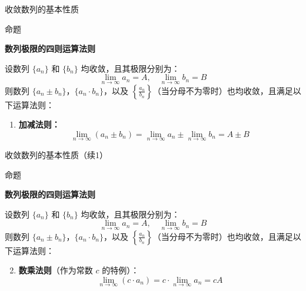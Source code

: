 \documentclass[aspectratio=169,10pt,fontset=fandol]{ctexbeamer}
\begin{document}
\begin{frame}[t,fragile]{收敛数列的基本性质}
\small
\begin{block}{命题}
{\small
\textbf{数列极限的四则运算法则}\par



设数列 $\{a_n\}$ 和 $\{b_n\}$ 均收敛，且其极限分别为：
\begin{equation*}
	\lim\limits_{n \to \infty} a_n = A, \quad \lim\limits_{n \to \infty} b_n = B
\end{equation*}
则数列 $\{a_n \pm b_n\}$，$\{a_n \cdot b_n\}$，以及 $\left\{\frac{a_n}{b_n}\right\}$（当分母不为零时）也均收敛，且满足以下运算法则：

\begin{enumerate}
	\item \textbf{加减法则：}
	\begin{equation*}
		\lim\limits_{n \to \infty} (a_n \pm b_n) = \lim\limits_{n \to \infty} a_n \pm \lim\limits_{n \to \infty} b_n = A \pm B
	\end{equation*}
	
	
\end{enumerate}
}
\end{block}
\end{frame}
\begin{frame}[t,fragile]{收敛数列的基本性质（续1）}
\small
\begin{block}{命题}
{\small
\textbf{数列极限的四则运算法则}\par



设数列 $\{a_n\}$ 和 $\{b_n\}$ 均收敛，且其极限分别为：
\begin{equation*}
	\lim\limits_{n \to \infty} a_n = A, \quad \lim\limits_{n \to \infty} b_n = B
\end{equation*}
则数列 $\{a_n \pm b_n\}$，$\{a_n \cdot b_n\}$，以及 $\left\{\frac{a_n}{b_n}\right\}$（当分母不为零时）也均收敛，且满足以下运算法则：

\begin{enumerate}
	\setcounter{enumi}{1}
\item \textbf{数乘法则}（作为常数 $c$ 的特例）：
	\begin{equation*}
		\lim\limits_{n \to \infty} (c \cdot a_n) = c \cdot \lim\limits_{n \to \infty} a_n = cA
	\end{equation*}
	
	
\end{enumerate}
}
\end{block}
\end{frame}
\end{document}
